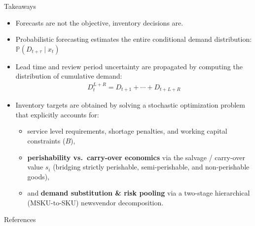 \documentclass[11pt]{beamer}
\begin{document}
\begin{frame}{Takeaways}
\begin{small}
\begin{itemize}
\item Forecasts are not the objective, inventory decisions are. 

\item Probabilistic forecasting estimates the entire conditional demand distribution: $\mathbb{P}(D_{t+\tau}\mid x_t)$

\item Lead time and review period uncertainty are propagated by computing the distribution of cumulative demand:
\begin{align*}
D^{L+R}_{t} = D_{t+1} + \cdots + D_{t+L+R}
\end{align*}
\item Inventory targets are obtained by solving a stochastic optimization problem that explicitly accounts for:
\begin{itemize}
    \item service level requirements, shortage penalties, and working capital constraints ($B$),
    \item \textbf{perishability vs.\ carry-over economics} via the salvage / carry-over value $s_i$ (bridging strictly perishable, semi-perishable, and non-perishable goods),
    \item and \textbf{demand substitution \& risk pooling} via a two-stage hierarchical (MSKU-to-SKU) newsvendor decomposition.
\end{itemize}
\end{itemize}
\end{small}
\end{frame}

\begin{frame}[t,allowframebreaks]{References}
\begin{footnotesize}
\printbibliography
\end{footnotesize}
\end{frame}
\end{document}
